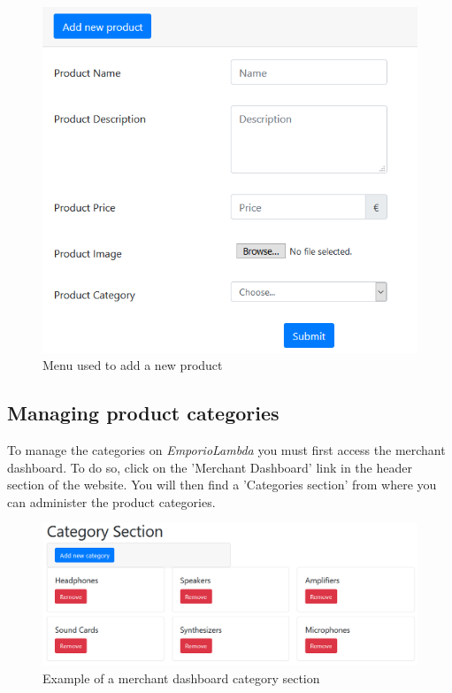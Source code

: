 \begin{figure}[H]
\centering
\includegraphics[scale=0.6]{res/Immagini/AddProduct}
\caption{Menu used to add a new product}
\end{figure}

\subsection{Managing product categories}
To manage the categories on \textit{EmporioLambda} you must first access the merchant dashboard. To do so, click on the 'Merchant Dashboard' link in the header section of the website. You will then find a 'Categories section' from where you can administer the product categories.

\begin{figure}[H]
\centering
\includegraphics[scale=0.6]{res/Immagini/CategorySection}
\caption{Example of a merchant dashboard category section}
\end{figure}

